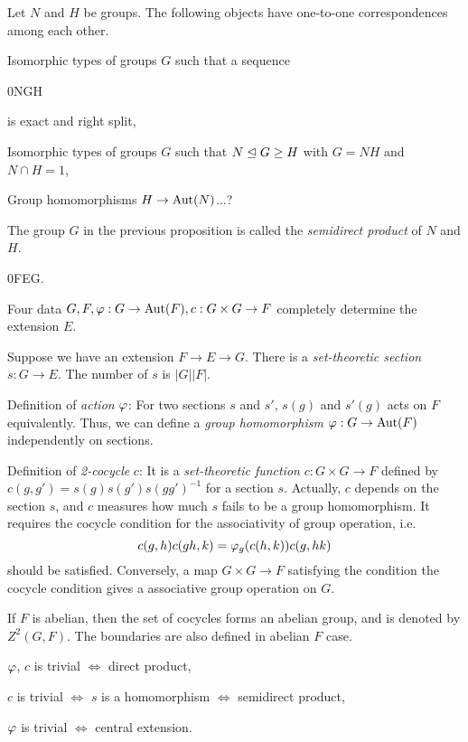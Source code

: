 \documentclass{../../large}
\begin{document}
\begin{prb}
Let $N$ and $H$ be groups.
The following objects have one-to-one correspondences among each other.
\begin{parts}
\item Isomorphic types of groups $G$ such that a sequence \begin{es}0\>N\>G\>H\end{es} is exact and right split,
\item Isomorphic types of groups $G$ such that $N\trianglelefteq G\ge H$ with $G=NH$ and $N\cap H=1$,
\item Group homomorphisms $H\to\operatorname{Aut}(N)$...?
\end{parts}
\end{prb}

\begin{defn}
The group $G$ in the previous proposition is called the \emph{semidirect product} of $N$ and $H$.
\end{defn}


\begin{es}
0\>F\>E\>G.
\end{es}
Four data $G,F,\varphi:G\to\operatorname{Aut}(F),c:G\times G\to F$ completely determine the extension $E$.

Suppose we have an extension $F\to E\to G$.
There is a \emph{set-theoretic section} $s:G\to E$.
The number of $s$ is $|G||F|$.

Definition of \emph{action} $\varphi$:
For two sections $s$ and $s'$, $s(g)$ and $s'(g)$ acts on $F$ equivalently.
Thus, we can define a \emph{group homomorphism} $\varphi:G\to\operatorname{Aut}(F)$ independently on sections.

Definition of \emph{2-cocycle} $c$:
It is a \emph{set-theoretic function} $c:G\times G\to F$ defined by $c(g,g')=s(g)s(g')s(gg')^{-1}$ for a section $s$.
Actually, $c$ depends on the section $s$, and $c$ measures how much $s$ fails to be a group homomorphism.
It requires the cocycle condition for the associativity of group operation, i.e.
\[c(g,h)c(gh,k)=\varphi_g(c(h,k))c(g,hk)\]
should be satisfied.
Conversely, a map $G\times G\to F$ satisfying the condition the cocycle condition gives a associative group operation on $G$.

If $F$ is abelian, then the set of cocycles forms an abelian group, and is denoted by $Z^2(G,F)$.
The boundaries are also defined in abelian $F$ case.


\begin{parts}
\item $\varphi$, $c$ is trivial $\iff$ direct product,
\item $c$ is trivial $\iff$ $s$ is a homomorphism $\iff$ semidirect product,
\item $\varphi$ is trivial $\iff$ central extension.
\end{parts}
\end{document}
